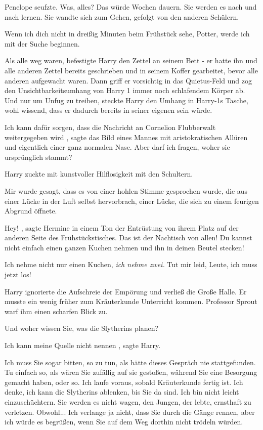 Penelope seufzte. \glqq Was, alles? Das würde Wochen dauern. Sie werden es nach
und nach lernen.\grqq{} Sie wandte sich zum Gehen, gefolgt von den anderen
Schülern.

\glqq Wenn ich dich nicht in dreißig Minuten beim Frühstück sehe, Potter, werde
ich mit der Suche beginnen.\grqq{}

Als alle weg waren, befestigte Harry den Zettel an seinem Bett - er hatte ihn
und alle anderen Zettel bereits geschrieben und in seinem Koffer gearbeitet,
bevor alle anderen aufgewacht waren. Dann griff er vorsichtig in das
Quietus-Feld und zog den Unsichtbarkeitsumhang von Harry 1 immer noch
schlafendem Körper ab. Und nur um Unfug zu treiben, steckte Harry den Umhang in
Harry-1s Tasche, wohl wissend, dass er dadurch bereits in seiner eigenen sein
würde.

\glqq Ich kann dafür sorgen, dass die Nachricht an Cornelion Flubberwalt
weitergegeben wird\grqq{} , sagte das Bild eines Mannes mit aristokratischen
Allüren und eigentlich einer ganz normalen Nase. \glqq Aber darf ich fragen,
woher sie ursprünglich stammt?\grqq{}

Harry zuckte mit kunstvoller Hilflosigkeit mit den Schultern.

\glqq Mir wurde gesagt, dass es von einer hohlen Stimme gesprochen wurde, die
aus einer Lücke in der Luft selbst hervorbrach, einer Lücke, die sich zu einem
feurigen Abgrund öffnete.\grqq{}

\glqq Hey!\grqq{} , sagte Hermine in einem Ton der Entrüstung von ihrem Platz
auf der anderen Seite des Frühstückstisches. \glqq Das ist der Nachtisch von
allen! Du kannst nicht einfach einen ganzen Kuchen nehmen und ihn in deinen
Beutel stecken!\grqq{}

\glqq Ich nehme nicht nur einen Kuchen, \emph{ich nehme zwei.} Tut mir leid,
Leute, ich muss jetzt los!\grqq{}

Harry ignorierte die Aufschreie der Empörung und verließ die Große Halle. Er
musste ein wenig früher zum Kräuterkunde Unterricht kommen. Professor Sprout
warf ihm einen scharfen Blick zu.

\glqq Und woher wissen Sie, was die Slytherins planen?\grqq{}

\glqq Ich kann meine Quelle nicht nennen\grqq{} , sagte Harry.

\glqq Ich muss Sie sogar bitten, so zu tun, als hätte dieses Gespräch nie
stattgefunden. Tu einfach so, als wären Sie zufällig auf sie gestoßen, während
Sie eine Besorgung gemacht haben, oder so. Ich laufe voraus, sobald Kräuterkunde
fertig ist. Ich denke, ich kann die Slytherins ablenken, bis Sie da sind. Ich
bin nicht leicht einzuschüchtern. Sie werden es nicht wagen, den Jungen, der
lebte, ernsthaft zu verletzen. Obwohl... Ich verlange ja nicht, dass Sie durch
die Gänge rennen, aber ich würde es begrüßen, wenn Sie auf dem Weg dorthin nicht
trödeln würden.\grqq{}

